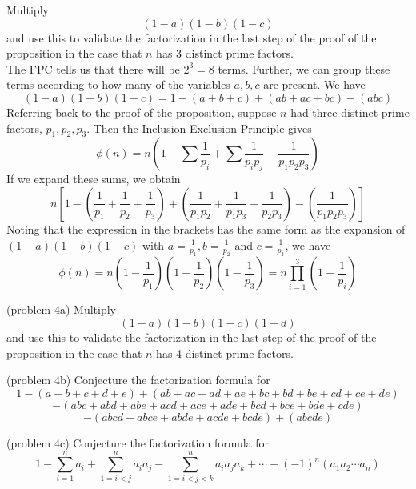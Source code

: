 \documentclass[handout]{ximera}
\begin{document}
\begin{example}[example 4]
Multiply
\[
(1-a)(1-b)(1-c)
\]
and use this to validate the factorization in the last step of the proof of the proposition in the case that $n$ has 3 distinct prime factors.\\
The FPC tells us that there will be $2^3 = 8$ terms.  Further, we can group these terms according to how many of the variables $a, b, c$ are present. We have
\[
(1-a)(1-b)(1-c) = 1 - (a+b+c) + (ab+ac+bc) - (abc)
\]
Referring back to the proof of the proposition, suppose $n$ had three distinct prime factors, $p_1, p_2, p_3$.
Then the Inclusion-Exclusion Principle gives
\[
\phi(n) = n\left(1 - \sum \frac{1}{p_i} + \sum \frac{1}{p_ip_j} - \frac{1}{p_1p_2p_3}\right)
\]
If we expand these sums, we obtain 
\[
n\left[1 - \left(\frac{1}{p_1} + \frac{1}{p_2}+\frac{1}{p_3}\right) + \left(\frac{1}{p_1p_2} + \frac{1}{p_1p_3} + \frac{1}{p_2p_3}\right) - \left(\frac{1}{p_1p_2p_3}\right)\right]
\]
Noting that the expression in the brackets has the same form as the expansion of $(1-a)(1-b)(1-c)$ with $a = \frac{1}{p_1},
b= \frac{1}{p_2}$ and $c = \frac{1}{p_3}$, we have
\[
 \phi(n) = n\left(1 - \frac{1}{p_1}\right)\left(1 - \frac{1}{p_2}\right)\left(1 - \frac{1}{p_3}\right) = n \prod_{i = 1}^3\left(1 - \frac{1}{p_i}\right)
 \]
 \end{example}
 
 \begin{problem}(problem 4a)
 Multiply
\[
(1-a)(1-b)(1-c)(1-d)
\]
and use this to validate the factorization in the last step of the proof of the proposition in the case that $n$ has 4 distinct prime factors.
\end{problem}

\begin{problem}(problem 4b)
Conjecture the factorization formula for
\[
1 - (a + b+c+d+e) + (ab+ac+ad+ae+bc+bd+be+cd+ce+de) 
\]
\[
- (abc+abd+abe+acd+ace+ade+bcd+bce+bde+cde) 
\]
\[
- (abcd+abce+abde+acde+bcde) + (abcde)
\]
\end{problem}

\begin{problem}(problem 4c)
Conjecture the factorization formula for
\[
1 - \sum_{i = 1}^n a_i + \sum_{1 = i <j}^n a_ia_j - \sum_{1 = i <j<k}^n a_ia_ja_k + \cdots + (-1)^n (a_1a_2\cdots a_n)
\]
\end{problem}
\end{document}
